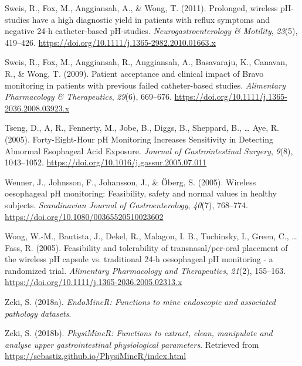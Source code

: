 \documentclass[english,man,floatsintext]{apa6}
\begin{document}
\leavevmode\hypertarget{ref-Sweis2011}{}%
Sweis, R., Fox, M., Anggiansah, A., \& Wong, T. (2011). Prolonged, wireless pH-studies have a high diagnostic yield in patients with reflux symptoms and negative 24-h catheter-based pH-studies. \emph{Neurogastroenterology \& Motility}, \emph{23}(5), 419--426. \url{https://doi.org/10.1111/j.1365-2982.2010.01663.x}

\leavevmode\hypertarget{ref-Sweis2009}{}%
Sweis, R., Fox, M., Anggiansah, R., Anggiansah, A., Basavaraju, K., Canavan, R., \& Wong, T. (2009). Patient acceptance and clinical impact of Bravo monitoring in patients with previous failed catheter-based studies. \emph{Alimentary Pharmacology \& Therapeutics}, \emph{29}(6), 669--676. \url{https://doi.org/10.1111/j.1365-2036.2008.03923.x}

\leavevmode\hypertarget{ref-TSENG2005a}{}%
Tseng, D., A, R., Fennerty, M., Jobe, B., Diggs, B., Sheppard, B., \ldots{} Aye, R. (2005). Forty-Eight-Hour pH Monitoring Increases Sensitivity in Detecting Abnormal Esophageal Acid Exposure. \emph{Journal of Gastrointestinal Surgery}, \emph{9}(8), 1043--1052. \url{https://doi.org/10.1016/j.gassur.2005.07.011}

\leavevmode\hypertarget{ref-Wenner2005}{}%
Wenner, J., Johnsson, F., Johansson, J., \& Öberg, S. (2005). Wireless oesophageal pH monitoring: Feasibility, safety and normal values in healthy subjects. \emph{Scandinavian Journal of Gastroenterology}, \emph{40}(7), 768--774. \url{https://doi.org/10.1080/00365520510023602}

\leavevmode\hypertarget{ref-Wong2005a}{}%
Wong, W.-M., Bautista, J., Dekel, R., Malagon, I. B., Tuchinsky, I., Green, C., \ldots{} Fass, R. (2005). Feasibility and tolerability of transnasal/per-oral placement of the wireless pH capsule vs. traditional 24-h oesophageal pH monitoring - a randomized trial. \emph{Alimentary Pharmacology and Therapeutics}, \emph{21}(2), 155--163. \url{https://doi.org/10.1111/j.1365-2036.2005.02313.x}

\leavevmode\hypertarget{ref-R-EndoMineR}{}%
Zeki, S. (2018a). \emph{EndoMineR: Functions to mine endoscopic and associated pathology datasets}.

\leavevmode\hypertarget{ref-R-PhysiMineR}{}%
Zeki, S. (2018b). \emph{PhysiMineR: Functions to extract, clean, manipulate and analyse upper gastrointestinal physiological parameters}. Retrieved from \url{https://sebastiz.github.io/PhysiMineR/index.html}

\endgroup
\end{document}
